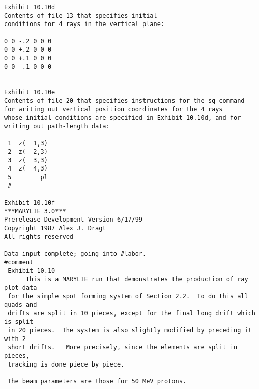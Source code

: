 \begin{footnotesize}
\begin{verbatim}
Exhibit 10.10d
Contents of file 13 that specifies initial
conditions for 4 rays in the vertical plane:

0 0 -.2 0 0 0
0 0 +.2 0 0 0
0 0 +.1 0 0 0
0 0 -.1 0 0 0


Exhibit 10.10e
Contents of file 20 that specifies instructions for the sq command
for writing out vertical position coordinates for the 4 rays
whose initial conditions are specified in Exhibit 10.10d, and for
writing out path-length data:

 1  z(  1,3)
 2  z(  2,3)
 3  z(  3,3)
 4  z(  4,3)
 5        pl
 #

Exhibit 10.10f
***MARYLIE 3.0***
Prerelease Development Version 6/17/99
Copyright 1987 Alex J. Dragt
All rights reserved

Data input complete; going into #labor.
#comment
 Exhibit 10.10
      This is a MARYLIE run that demonstrates the production of ray plot data
 for the simple spot forming system of Section 2.2.  To do this all quads and
 drifts are split in 10 pieces, except for the final long drift which is split
 in 20 pieces.  The system is also slightly modified by preceding it with 2
 short drifts.   More precisely, since the elements are split in pieces,
 tracking is done piece by piece.

 The beam parameters are those for 50 MeV protons.


\end{verbatim}
\end{footnotesize}
